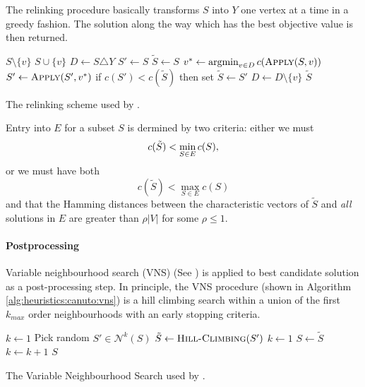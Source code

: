 The relinking procedure basically transforms $S$ into $Y$ one vertex at a time in a greedy fashion.
The solution along the way which has the best objective value is then returned.
 \begin{algorithm}[h!]
   \begin{algorithmic}[1]
     \State \Return $S \setminus \{v\}$
     \Else
     \State \Return $S \cup \{v\}$
     \EndIf
     \EndProcedure
     \State $D \gets S \triangle Y$
     \State $S' \gets S$
     \State $\tilde{S} \gets S$
     \State $v^* \gets \argmin_{v \in D} c(\Call{Apply}{S,v})$
     \State $S' \gets \Call{Apply}{S', v^*}$
     \State if $c(S') < c(\tilde{S})$ then set $\tilde{S} \gets S'$
     \State $D \gets D \setminus \{v\}$
     \EndWhile
     \State \Return $\tilde{S}$
     \EndProcedure
 \end{algorithmic}
 \caption{The relinking scheme used by \citet{canuto2001local}.}\label{heuristics:canuto:relink}
 \end{algorithm}

 Entry into $E$ for a subset $S$ is dermined by two criteria:
 either we must
 $$c(\tilde{S}) < \min_{S \in E} c(S)\mathnormal{,}$$
 or we must have both
 $$c(\tilde{S}) < \max_{S \in E} c(S)$$
  and that the Hamming distances between the characteristic vectors of $\tilde{S}$
   and \textit{all} solutions in $E$ are greater than $\rho |V|$ for some $\rho \leq 1$. 

\paragraph{Postprocessing}
Variable neighbourhood search (VNS) (See \citet{hansen2010variable}) is applied
to best candidate solution as a post-processing step. In principle, the VNS
procedure (shown in Algorithm \ref{alg:heuristics:canuto:vns}) is a hill climbing
search within a union of the first $k_{max}$ order neighbourhoods with an early stopping
 criteria.
\begin{algorithm}[h!]
   \begin{algorithmic}[1]
     \State $k \gets 1$
     \State Pick random $S' \in \mathcal{N}^k(S)$
     \State $\tilde{S} \gets \Call{Hill-Climbing}{S'}$
     \State $k \gets 1$
     \State $S \gets \tilde{S}$
     \Else
     \State $k \gets k + 1$
     \EndIf
     \EndWhile
     \EndFor
     \State \Return $S$
     \EndProcedure
 \end{algorithmic}
 \caption{The Variable Neighbourhood Search
   used by \citet{canuto2001local}.}\label{alg:heuristics:canuto:vns}
 \end{algorithm}

